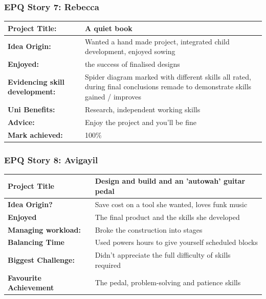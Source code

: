 \subsubsection*{EPQ Story 7: Rebecca}
\begin{tabularx}{\textwidth}{@{}lX@{}}
    \toprule

    \textbf{Project Title:}     &
    A quiet book

    \\
    \midrule
    \textbf{Idea Origin:}      &
  Wanted a hand made project, integrated child development, enjoyed sowing

    \\
    \textbf{Enjoyed:} &
the success of finalised designs
    \\
    \textbf{Evidencing skill development:}    &
Spider diagram marked with different skills all rated, during final conclusions remade to demonstrate skills gained / improves
    \\

    \textbf{Uni Benefits:}     &
    Research, independent working skills
    \\

     \textbf{Advice:}     &
    Enjoy the project and you'll be fine
    \\

     \textbf{Mark achieved:}     &
    100\%
    \\
    \bottomrule
\end{tabularx}



\subsubsection*{EPQ Story 8: Avigayil}
\begin{tabularx}{\textwidth}{@{}lX@{}}
    \toprule

    \textbf{Project Title}     &
    Design and build and an 'autowah' guitar pedal

    \\
    \midrule
    \textbf{Idea Origin?}      &
Save cost on a tool she wanted, loves funk music
    \\
    \textbf{Enjoyed} &
The final product and the skills she developed

    \\
    \textbf{Managing workload:}    &
 Broke the construction into stages
    \\

    \textbf{Balancing Time}     &
Used powers hours to give yourself scheduled blocks

    \\

     \textbf{Biggest Challenge:}     &
  Didn't appreciate the full difficulty of skills required

    \\

     \textbf{Favourite Achievement}     &
    The pedal, problem-solving and patience skills
    \\
    \bottomrule
\end{tabularx}

